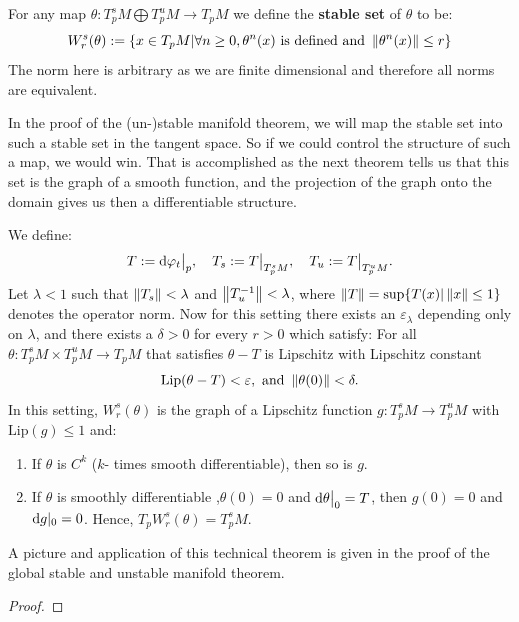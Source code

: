 \begin{definition}
	For any map $\theta: T_p^sM\bigoplus T_p^uM\to T_pM$ we define the \textbf{stable set} of $\theta$ to be:
	\begin{equation*}
		W^s_r(\theta):=\{x\in T_pM| \forall n \geq 0, \theta^n(x) \text{ is defined and } \left\lVert\theta^n(x)\right\rVert \leq r\}
	\end{equation*} The norm here is arbitrary as we are finite dimensional and therefore all norms are equivalent.
\end{definition}
\begin{remark}
	In the proof of the (un-)stable manifold theorem, we will map the stable set into such a stable set in the tangent space. So if we could control the structure of such a map, we would win. That is accomplished as the next theorem tells us that this set is the graph of a smooth function, and the projection of the graph onto the domain gives us then a differentiable structure.
\end{remark}


\begin{theorem} \label{thm: local (un-)stable manifold theorem}
	We define:
	\begin{align*}
		T:=\mathop{}\!\mathrm{d} \varphi_t\big|_p,\quad T_s:=T\big|_{T_p^sM},\quad T_u:=T\big|_{T_p^uM}.
	\end{align*} Let $\lambda<1$ such that $\left\lVert T_s\right\rVert<\lambda$ and $\left\lVert T_u^{-1}\right\rVert<\lambda$, where $\left\lVert T\right\rVert= \sup\{T(x)|\left\lVert x\right\rVert\leq 1\}$ denotes the operator norm. Now for this setting there exists an $\varepsilon_{\lambda}$ depending only on $\lambda$, and there exists a $\delta>0$ for every $r>0$ which satisfy: For all $\theta:T_p^sM \times T_p^uM \to T_pM$ that satisfies $\theta-T$ is Lipschitz with Lipschitz constant
	\begin{equation*}
		\mathrm{Lip}(\theta-T)<\varepsilon , \text{ and }\left\lVert\theta(0)\right\rVert<\delta.
	\end{equation*}In this setting, 
	$W^s_r(\theta)$ is the graph of a Lipschitz function $g:T^s_pM\to T^u_pM$ with $ \text{Lip}(g)\leq 1$ and:
	\begin{enumerate}
		\item If $\theta$ is $C^k$ ($k$- times smooth differentiable), then so is $g$.
		\item If $\theta$ is smoothly differentiable ,$\theta(0)=0$ and $\mathop{}\!\mathrm{d} \theta\big|_0=T$, then $g(0)=0$ and $\mathop{}\!\mathrm{d} g |_0=0$. Hence, $T _pW^s_r(\theta)=T^s_pM$.
	\end{enumerate}
	A picture and application of this technical theorem is given in the proof of the global stable and unstable manifold theorem. 
\end{theorem}
\begin{proof}
\end{proof}

